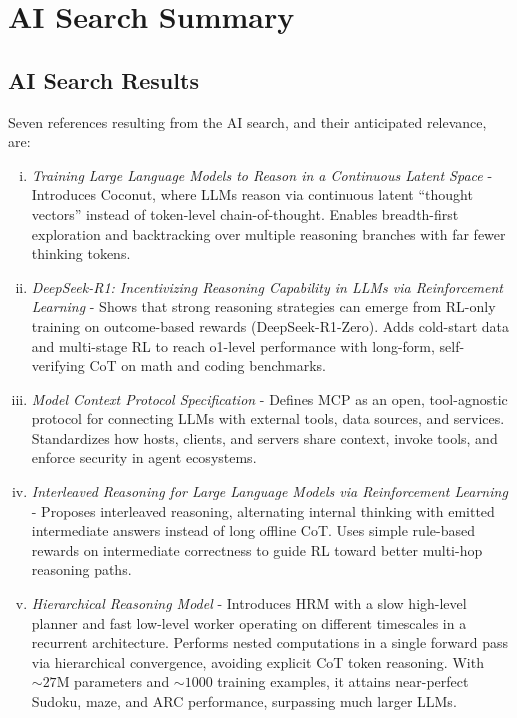 \documentclass[a4paper,oneside,12pt]{book}
\numberwithin{equation}{chapter} %
\begin{document}
\section{AI Search Summary}
\subsection{AI Search Results}

Seven references resulting from the AI search, and their anticipated relevance, are:
\begin{enumerate} [(i)]
\item \cite{hao2025traininglargelanguagemodels} \textit{Training Large Language Models to Reason in a Continuous Latent Space} - Introduces Coconut, where LLMs reason via continuous latent “thought vectors” instead of token-level chain-of-thought. Enables breadth-first exploration and backtracking over multiple reasoning branches with far fewer thinking tokens. 
\item \cite{deepseekai2025deepseekr1incentivizingreasoningcapability} \textit{DeepSeek-R1: Incentivizing Reasoning Capability in LLMs via Reinforcement Learning} - Shows that strong reasoning strategies can emerge from RL-only training on outcome-based rewards (DeepSeek-R1-Zero). Adds cold-start data and multi-stage RL to reach o1-level performance with long-form, self-verifying CoT on math and coding benchmarks.
\item \cite{anthropic2024mcp} \textit{Model Context Protocol Specification} - Defines MCP as an open, tool-agnostic protocol for connecting LLMs with external tools, data sources, and services. Standardizes how hosts, clients, and servers share context, invoke tools, and enforce security in agent ecosystems.
\item \cite{xie2025interleavedreasoninglargelanguage} \textit{Interleaved Reasoning for Large Language Models via Reinforcement Learning} - Proposes interleaved reasoning, alternating internal thinking with emitted intermediate answers instead of long offline CoT. Uses simple rule-based rewards on intermediate correctness to guide RL toward better multi-hop reasoning paths. 
\item \cite{wang2025hierarchicalreasoningmodel} \textit{Hierarchical Reasoning Model} - Introduces HRM with a slow high-level planner and fast low-level worker operating on different timescales in a recurrent architecture. Performs nested computations in a single forward pass via hierarchical convergence, avoiding explicit CoT token reasoning. With \(\sim 27\)M parameters and \(\sim 1000\) training examples, it attains near-perfect Sudoku, maze, and ARC performance, surpassing much larger LLMs.

\end{enumerate}
\end{document}
